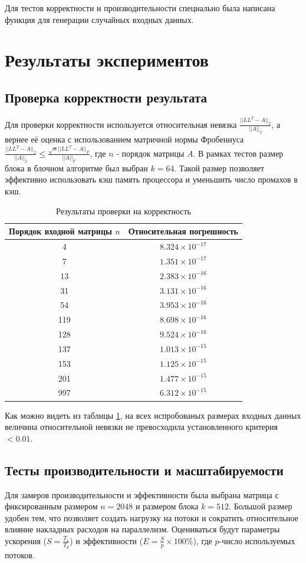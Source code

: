 \documentclass[11pt, a4paper]{article}
\def\newsection#1{
    \section{#1}
}
\def\newsubsection#1{
    \subsection{#1}
}
\begin{document}
Для тестов корректности и производительности специально была написана функция для генерации случайных входных данных.

\newsection{Результаты экспериментов}
\newsubsection{Проверка корректности результата}
Для проверки корректности используется относительная невязка $\frac{|| LL^T - A ||_2}{||A||_2}$, а вернее её оценка с использованием
матричной нормы Фробениуса $\frac{|| LL^T - A ||_2}{||A||_2} \leqslant \frac{\sqrt{n}|| LL^T - A ||_F}{||A||_F}$, где $n$ - порядок матрицы $A$.
В рамках тестов размер блока в блочном алгоритме был выбран $k = 64$. Такой размер позволяет эффективно использовать кэш память процессора
и уменьшить число промахов в кэш.

\begin{table}[H]
    \centering
    \begin{tabular}{| c | c |}
        \hline
        Порядок входной матрицы $n$ & Относительная погрешность \\
        \hline
        4 & $8.324 \times 10^{-17}$ \\
        7 & $1.351 \times 10^{-17}$ \\
        13 & $2.383 \times 10^{-16}$ \\
        31 & $3.131 \times 10^{-16}$ \\
        54 & $3.953 \times 10^{-16}$ \\
        119 & $8.698 \times 10^{-16}$ \\
        128 & $9.524 \times 10^{-16}$ \\
        137 & $1.013 \times 10^{-15}$ \\
        153 & $1.125 \times 10^{-15}$ \\
        201 & $1.477 \times 10^{-15}$ \\
        997 & $6.312 \times 10^{-15}$ \\
        \hline
    \end{tabular}
    \caption{Результаты проверки на корректность}
    \label{table:1}
\end{table}

Как можно видеть из таблицы \ref{table:1}, на всех испробованых размерах входных данных величина относительной невязки не превосходила
установленного критерия $< 0.01$.

\newsubsection{Тесты производительности и масштабируемости}
Для замеров производительности и эффективности была выбрана матрица с фиксированным размером $n = 2048$ и размером блока $k = 512$. Большой размер удобен тем,
что позволяет создать нагрузку на потоки и сократить относительное влияние накладных расходов на параллелизм. Оцениваться будут параметры ускорения
($S = \frac{T_1}{T_p}$) и эффективности ($E = \frac{S}{p} \times 100\%$), где $p$-число используемых потоков.
\end{document}
